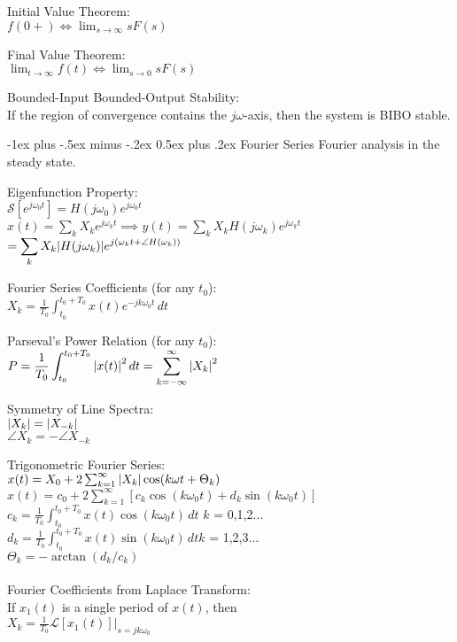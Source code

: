\documentclass[12pt,landscape]{article}
\makeatletter
\renewcommand{\section}{\@startsection{section}{1}{0mm}%
                                {-1ex plus -.5ex minus -.2ex}%
                                {0.5ex plus .2ex}%
                                {\normalfont\normalsize\bfseries}}
\newcommand{\tab}{\hspace{.02\textwidth}}
\newcommand{\ds}{\displaystyle}
\makeatother
\begin{document}
\begin{multicols*}{3}
Initial Value Theorem:\\
\tab $\ds f(0+) \Leftrightarrow \lim_{s\rightarrow\infty} sF(s)$

Final Value Theorem:\\
\tab $\ds \lim_{t\rightarrow\infty} f(t) \Leftrightarrow \lim_{s\rightarrow 0} sF(s)$

Bounded-Input Bounded-Output Stability:\\
\tab If the region of convergence contains the $j\omega$-axis, then the system is BIBO stable.

\section{Fourier Series}
\tab Fourier analysis in the steady state.

Eigenfunction Property:\\
\tab $\mathcal{S}[e^{j\omega_0t}] = H(j\omega_0)e^{j\omega_0t}$\\
\tab $\ds x(t) = \sum_k X_k e^{j\omega_kt} \implies y(t) = \sum_k X_k H(j\omega_k)e^{j\omega_kt}$\\\hspace{3.5cm}$\ds = \sum_k X_k \abs{H(j\omega_k)}e^{j(\omega_kt + \angle H(\omega_k))}$

Fourier Series Coefficients (for any $t_0$):\\
\tab $\ds X_k = \frac{1}{T_0}\int_{t_0}^{t_0 + T_0}x(t)e^{-jk\omega_0t}\,dt$

Parseval's Power Relation (for any $t_0$):\\
\tab $\ds P = \frac{1}{T_0} \int_{t_0}^{t_0 + T_0}\abs{x(t)}^2\,dt = \sum_{k = -\infty}^{\infty}\abs{X_k}^2$

Symmetry of Line Spectra:\\
\tab $\abs{X_k} = \abs{X_{-k}}$\\
\tab $\angle X_k = -\angle X_{-k}$

Trigonometric Fourier Series:\\
\tab $x(t) = X_0 + 2\sum_{k = 1}^{\infty}\abs{X_k}\cos(k\omega t + \Theta_k)$\\
\tab $x(t) = c_0 + 2\sum_{k = 1}^{\infty}[c_k\cos(k\omega_0 t) + d_k\sin(k\omega_0 t)]$\\
\tab $\ds c_k = \frac{1}{T_0} \int_{t_0}^{t_0 + T_0}x(t)\cos(k\omega_0 t)\,dt$ \quad $k$ = 0,1,2$\ldots$\\
\tab $\ds d_k = \frac{1}{T_0} \int_{t_0}^{t_0 + T_0}x(t)\sin(k\omega_0 t)\,dt$\quad $k$ = 1,2,3$\ldots$\\
\tab $\Theta_k = -\arctan(d_k/c_k)$
\\~\\
Fourier Coefficients from Laplace Transform:\\
\tab If $x_1(t)$ is a single period of $x(t)$, then\\
\tab $\ds X_k = \frac{1}{T_0}\mathcal{L}[x_1(t)] \big\rvert_{s = jk\omega_0}$


\end{multicols*}
\end{document}
